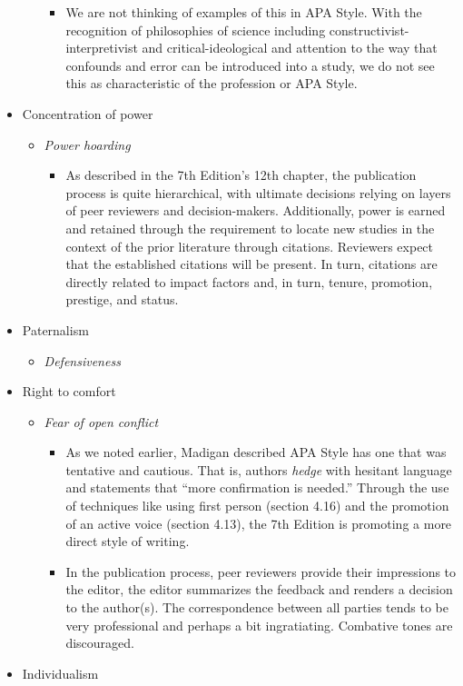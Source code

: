 \documentclass[
  11pt,
]{book}
\providecommand{\tightlist}{%
  \setlength{\itemsep}{0pt}\setlength{\parskip}{0pt}}
\begin{document}
\begin{itemize}
\begin{itemize}
    \begin{itemize}
    \tightlist
    \item
      We are not thinking of examples of this in APA Style. With the recognition of philosophies of science including constructivist-interpretivist and critical-ideological and attention to the way that confounds and error can be introduced into a study, we do not see this as characteristic of the profession or APA Style.
    \end{itemize}
  \end{itemize}
\item
  Concentration of power

  \begin{itemize}
  \tightlist
  \item
    \emph{Power hoarding}

    \begin{itemize}
    \tightlist
    \item
      As described in the 7th Edition's 12th chapter, the publication process is quite hierarchical, with ultimate decisions relying on layers of peer reviewers and decision-makers. Additionally, power is earned and retained through the requirement to locate new studies in the context of the prior literature through citations. Reviewers expect that the established citations will be present. In turn, citations are directly related to impact factors and, in turn, tenure, promotion, prestige, and status.
    \end{itemize}
  \end{itemize}
\item
  Paternalism

  \begin{itemize}
  \tightlist
  \item
    \emph{Defensiveness}
  \end{itemize}
\item
  Right to comfort

  \begin{itemize}
  \tightlist
  \item
    \emph{Fear of open conflict}

    \begin{itemize}
    \tightlist
    \item
      As we noted earlier, Madigan \citeyearpar{madigan_language_1995} described APA Style has one that was tentative and cautious. That is, authors \emph{hedge} with hesitant language and statements that ``more confirmation is needed.'' Through the use of techniques like using first person (section 4.16) and the promotion of an active voice (section 4.13), the 7th Edition is promoting a more direct style of writing.
    \item
      In the publication process, peer reviewers provide their impressions to the editor, the editor summarizes the feedback and renders a decision to the author(s). The correspondence between all parties tends to be very professional and perhaps a bit ingratiating. Combative tones are discouraged.
    \end{itemize}
  \end{itemize}
\item
  Individualism


\end{itemize}
\end{document}
